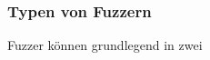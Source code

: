 

\subsubsection{Typen von Fuzzern}\label{subsubsec:typen-von-fuzzern}
Fuzzer können grundlegend in zwei

